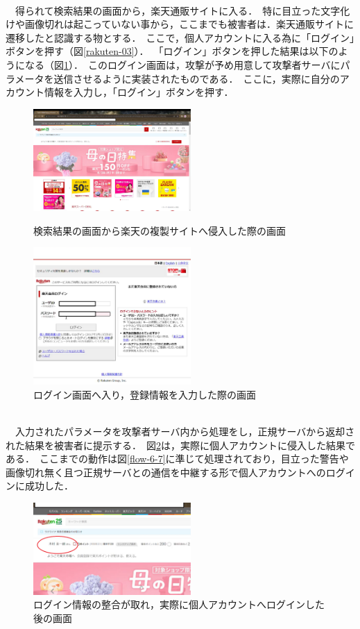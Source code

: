 \documentclass[dvipdfmx,twocolumn]{jsarticle}
\begin{document}
                \\
                　得られて検索結果の画面から，楽天通販サイトに入る．\
                特に目立った文字化けや画像切れは起こっていない事から，ここまでも被害者は．楽天通販サイトに遷移したと認識する物とする．\
                ここで，個人アカウントに入る為に「ログイン」ボタンを押す（図\ref{rakuten-03}）．\
                「ログイン」ボタンを押した結果は以下のようになる（図\ref{rakuten-04}）．\
                このログイン画面は，攻撃が予め用意して攻撃者サーバにパラメータを送信させるように実装されたものである．\
                ここに，実際に自分のアカウント情報を入力し，「ログイン」ボタンを押す．\
                \begin{figure}[h]
                    \centering
                    \includegraphics[width=6cm]{img/rakuten/rakuten-03.png}
                    \caption{検索結果の画面から楽天の複製サイトへ侵入した際の画面}
                    \label{rakuten-03}
                    \includegraphics[width=6cm]{img/rakuten/rakuten-04.png}
                    \caption{ログイン画面へ入り，登録情報を入力した際の画面}
                    \label{rakuten-04}
                \end{figure}
                \\
                　入力されたパラメータを攻撃者サーバ内から処理をし，正規サーバから返却された結果を被害者に提示する．\
                図\ref{rakuten-05}は，実際に個人アカウントに侵入した結果である．\
                ここまでの動作は図\ref{flow-6-7}に準じて処理されており，目立った警告や画像切れ無く且つ正規サーバとの通信を中継する形で個人アカウントへのログインに成功した．\
                \begin{figure}[h]
                    \centering
                    \includegraphics[width=6cm]{img/rakuten/rakuten-05.png}
                    \caption{ログイン情報の整合が取れ，実際に個人アカウントへログインした後の画面}
                    \label{rakuten-05}
                \end{figure}
\end{document}
